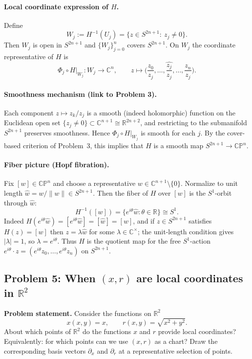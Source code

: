 \documentclass[12pt,a4paper]{article}
\theoremstyle{plain}
\theoremstyle{definition}      %
\begin{document}
\paragraph{Local coordinate expression of $H$.}
Define
\[
W_j:=H^{-1}(U_j)=\{z\in S^{2n+1}:\ z_j\neq 0\}.
\]
Then $W_j$ is open in $S^{2n+1}$ and $\{W_j\}_{j=0}^n$ covers $S^{2n+1}$.
On $W_j$ the coordinate representative of $H$ is
\[
\Phi_j\circ H\big|_{W_j}:W_j\to\mathbb C^n,
\qquad
z\longmapsto
\Big(\frac{z_0}{z_j},\dots,\widehat{\frac{z_j}{z_j}},\dots,\frac{z_n}{z_j}\Big).
\]

\paragraph{Smoothness mechanism (link to Problem 3).}
Each component $z\mapsto z_k/z_j$ is a smooth (indeed holomorphic) function on the Euclidean open set
$\{z_j\neq 0\}\subset\mathbb C^{n+1}\cong\mathbb R^{2n+2}$, and restricting to the submanifold $S^{2n+1}$ preserves smoothness.
Hence $\Phi_j\circ H|_{W_j}$ is smooth for each $j$.
By the cover-based criterion of Problem~3, this implies that $H$ is a smooth map $S^{2n+1}\to\mathbb{CP}^n$.

\paragraph{Fiber picture (Hopf fibration).}
Fix $[w]\in\mathbb{CP}^n$ and choose a representative $w\in\mathbb C^{n+1}\setminus\{0\}$.
Normalize to unit length $\hat w=w/\|w\|\in S^{2n+1}$.
Then the fiber of $H$ over $[w]$ is the $S^1$-orbit through $\hat w$:
\[
H^{-1}([w])=\{e^{i\theta}\hat w:\theta\in\mathbb R\}\cong S^1.
\]
Indeed $H(e^{i\theta}\hat w)=[e^{i\theta}\hat w]=[\hat w]=[w]$, and if $z\in S^{2n+1}$ satisfies $H(z)=[w]$
then $z=\lambda \hat w$ for some $\lambda\in\mathbb C^\times$; the unit-length condition gives $|\lambda|=1$,
so $\lambda=e^{i\theta}$.
Thus $H$ is the quotient map for the free $S^1$-action $e^{i\theta}\cdot z=(e^{i\theta}z_0,\dots,e^{i\theta}z_n)$ on $S^{2n+1}$.



\subsection*{Problem 5: When $(x,r)$ are local coordinates in $\mathbb R^2$}

\noindent\textbf{Problem statement.}
Consider the functions on $\mathbb R^2$
\[
x(x,y)=x,\qquad r(x,y)=\sqrt{x^2+y^2}.
\]
About which points of $\mathbb R^2$ do the functions $x$ and $r$ provide local coordinates?
Equivalently: for which points can we use $(x,r)$ as a chart?
Draw the corresponding basis vectors $\partial_x$ and $\partial_r$ at a representative selection of points.
\end{document}
